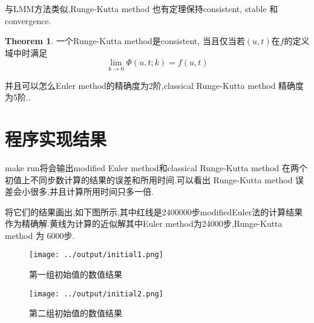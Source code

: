 \documentclass[a4paper]{book}
\numberwithin{equation}{chapter}
\theoremstyle{definition}
\newtheorem{thm}{Theorem}[chapter]
\begin{document}
与LMM方法类似,Runge-Kutta method 也有定理保持consistent, stable 和 convergence.

\begin{thm}
	一个Runge-Kutta method是consistent, 当且仅当若$(u,t)$在$f$的定义域中时满足
	\[\lim_{k\rightarrow 0} \Phi(u,t;k) = f(u,t)\]
\end{thm}

并且可以怎么Euler method的精确度为2阶,classical Runge-Kutta method 精确度为5阶..


\section{程序实现结果}

make run将会输出modified Euler method和classical Runge-Kutta method 在两个初值上不同步数计算的结果的误差和所用时间.可以看出 Runge-Kutta method 误差会小很多,并且计算所用时间只多一倍.

将它们的结果画出,如下图所示,其中红线是2400000步modifiedEuler法的计算结果作为精确解.黄线为计算的近似解其中Euler method为24000步,Runge-Kutta method 为 6000步.


\begin{figure}
	\centering
	\texttt{[image: ../output/initial1.png]}
	\caption{第一组初始值的数值结果}
\end{figure}


\begin{figure}
	\centering
	\texttt{[image: ../output/initial2.png]}
	\caption{第二组初始值的数值结果}
\end{figure}
\end{document}
